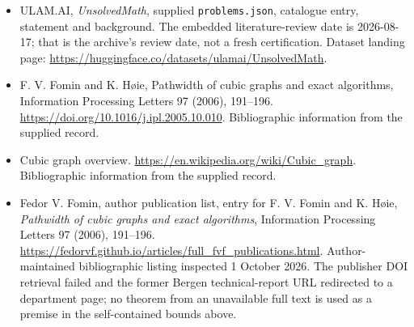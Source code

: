 \documentclass[11pt,a4paper]{article}
\begin{document}
{\small

\begin{itemize}

\item[\hypertarget{source:statement:1}{S1}] ULAM.AI, \emph{UnsolvedMath}, supplied \texttt{problems.json}, catalogue entry, statement and background. The embedded literature-review date is 2026-08-17; that is the archive’s review date, not a fresh certification. Dataset landing page: \url{https://huggingface.co/datasets/ulamai/UnsolvedMath}.

\item[\hypertarget{source:statement:2}{S2}] F. V. Fomin and K. Høie, Pathwidth of cubic graphs and exact algorithms, Information Processing Letters 97 (2006), 191--196. \url{https://doi.org/10.1016/j.ipl.2005.10.010}. Bibliographic information from the supplied record.

\item[\hypertarget{source:statement:3}{S3}] Cubic graph overview. \url{https://en.wikipedia.org/wiki/Cubic_graph}. Bibliographic information from the supplied record.


\item[E1] Fedor V. Fomin, author publication list,
entry for F. V. Fomin and K. H\o ie, \emph{Pathwidth of cubic graphs
and exact algorithms}, Information Processing Letters 97 (2006),
191--196. \url{https://fedorvf.github.io/articles/full_fvf_publications.html}.
Author-maintained bibliographic listing inspected 1 October 2026.
The publisher DOI retrieval failed and the former Bergen technical-report
URL redirected to a department page; no theorem from an unavailable
full text is used as a premise in the self-contained bounds above.

\end{itemize}

}

\label{end:statement}
\end{document}
